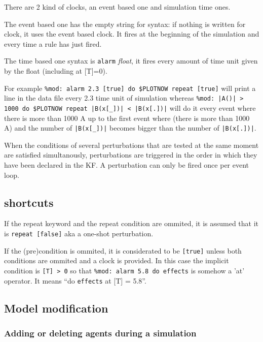 \documentclass[11pt]{book}
\def\ttt#1{\texttt{#1}}
\begin{document}
There are 2 kind of clocks, an event based one and simulation time ones.

The event based one has the empty string for syntax: if nothing is
written for clock, it uses the event based clock. It fires at the
beginning of the simulation and every time a rule has just fired.

The time based one syntax is \ttt{alarm} \textit{float}, it fires
every amount of time unit given by the float (including at [T]=0).

For example
\lstinline[language=kappa]@%mod: alarm 2.3 [true] do $PLOTNOW repeat [true]@
will print a line in the data file every 2.3 time unit of
simulation whereas
\lstinline[language=kappa]@%mod: |A()| > 1000 do $PLOTNOW repeat |B(x[_])| < |B(x[.])|@
will do it every event where there is more than
1000 A up to the first event where (there is more than 1000 A) and
the number of \lstinline[language=kappa]@|B(x[_])|@ becomes bigger than the number of
\lstinline[language=kappa]@|B(x[.])|@.

When the conditions of several perturbations that are tested at the
same moment are satisfied simultanously, perturbations are triggered
in the order in which they have been declared in the KF. A perturbation can only be fired once per event loop.

\subsection{shortcuts}
If the repeat keyword and the repeat condition are ommited, it is assumed that it is
\lstinline[language=kappa]!repeat [false]! aka a one-shot perturbation.

If the (pre)condition is ommited, it is considerated to be
\lstinline[language=kappa]![true]! unless both conditions are ommited
and a clock is provided. In this case the implicit condition is
\lstinline[language=kappa]![T] > 0! so that
\lstinline[language=kappa]!%mod: alarm 5.8 do effects!
is somehow a 'at' operator. It means ``do \texttt{effects} at [T] = 5.8''.

\subsection{Model modification}
\subsubsection{Adding or deleting agents during a simulation}
\end{document}
